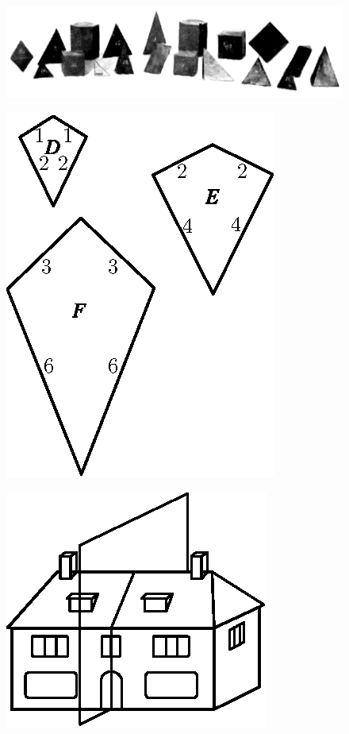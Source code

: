 \begin{figure}[H]
\centering
\includegraphics[scale=.9]{figure/fig_33.eps}
\caption{}\label{chap6-fig33}
\end{figure}

\begin{figure}[H]
\centering
\includegraphics[scale=.9]{figure/fig_34.eps}
\caption{}\label{chap6-fig34}
\end{figure}

\begin{figure}[H]
\centering
\includegraphics[scale=.9]{figure/fig_35.eps}
\caption{}\label{chap6-fig35}
\end{figure}

